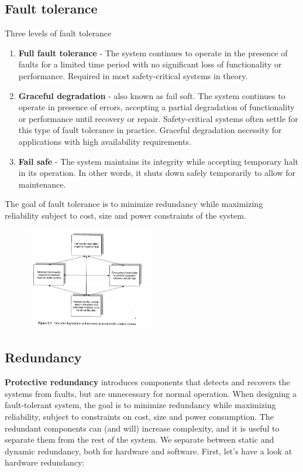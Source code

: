 \subsection{Fault tolerance}
Three levels of fault tolerance
\begin{enumerate}
\item \textbf{Full fault tolerance} - The system continues to operate in the presence of faults for a limited time period with no significant loss of functionality or performance. Required in most safety-critical systems in theory.
\item \textbf{Graceful degradation} - also known as fail soft. The system continues to operate in presence of errors, accepting a partial degradation of functionality or performance until recovery or repair. Safety-critical systems often settle for this type of fault tolerance in practice. Graceful degradation necessity for applications with high availability requirements.
\item \textbf{Fail safe} - The system maintains its integrity while accepting temporary halt in  its operation. In other words, it shuts down safely temporarily to allow for maintenance. 
\end{enumerate}

The goal of fault tolerance is to minimize redundancy while maximizing reliability subject to cost, size and power constraints of the system.

\begin{figure}[H]
\centering
\includegraphics[width=0.5\textwidth]{figures/Fault_Tolerance/graceful_degradation_example.PNG}
\end{figure}

\subsection{Redundancy}
\textbf{Protective redundancy} introduces components that detects and recovers
the systems from faults, but are unnecessary for normal operation. When
designing a fault-tolerant system, the goal is to minimize redundancy while
maximizing reliability, subject to constraints on cost, size and power consumption. The redundant components can (and will) increase complexity, and it is useful to separate them from the rest of the system.
We separate between static and dynamic redundancy, both for hardware
and software. First, let’s have a look at hardware redundancy:

